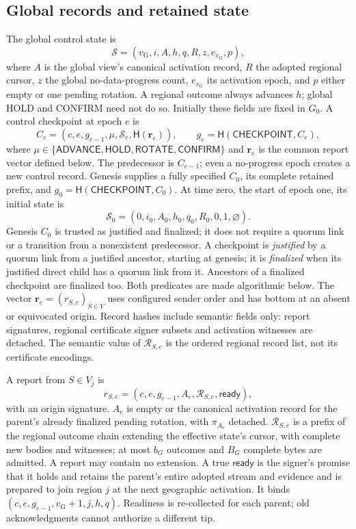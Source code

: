 \documentclass[11pt,a4paper,onecolumn]{article}
\newcommand{\Hash}{\mathsf H}
\newcommand{\gv}{v_{\mathrm G}}
\newcommand{\Tag}[1]{\mathsf{#1}}
\theoremstyle{remark}\newtheorem{example}[definition]{Example}
\begin{document}
\subsection{Global records and retained state}\label{sec:gobjects}
The global control state is
\[
 \mathcal S=(\gv,i,A,h,q,R,z,e_{\gv},p),
\]
where $A$ is the global view's canonical activation record, $R$ the adopted regional cursor,
$z$ the global no-data-progress count, $e_{\gv}$ its activation epoch, and $p$ either
empty or one pending rotation. A regional outcome always advances $h$; global
HOLD and CONFIRM need not do so. Initially these fields are fixed in $G_0$.
A control checkpoint at epoch $e$ is
\begin{equation}\label{eq:global}
 C_e=(c,e,g_{e-1},\mu,\mathcal S_e,\Hash(\mathbf r_e)),\qquad
 g_e=\Hash(\Tag{CHECKPOINT},C_e),
\end{equation}
where $\mu\in\{\Tag{ADVANCE},\Tag{HOLD},\Tag{ROTATE},\Tag{CONFIRM}\}$ and
$\mathbf r_e$ is the common report vector defined below. The predecessor is
$C_{e-1}$; even a no-progress epoch creates a new control record. Genesis
supplies a fully specified $C_0$, its complete retained prefix, and
$g_0=\Hash(\Tag{CHECKPOINT},C_0)$. At time zero, the start of epoch one,
its initial state is
\[
 \mathcal S_0=(0,i_0,A_0,h_0,q_0,R_0,0,1,\varnothing).
\]
Genesis $C_0$ is trusted as justified and finalized; it does not require a
quorum link or a transition from a nonexistent predecessor.
A checkpoint is \emph{justified} by a quorum link from a justified ancestor,
starting at genesis; it is \emph{finalized} when its justified direct child has
a quorum link from it. Ancestors of a finalized checkpoint are finalized too.
Both predicates are made algorithmic below.
The vector $\mathbf r_e=(r_{S,e})_{S\in V}$ uses configured sender order and
has bottom at an absent or equivocated origin. Record hashes include semantic
fields only: report signatures, regional certificate signer subsets and
activation witnesses are detached. The semantic value of $\mathcal R_{S,e}$
is the ordered regional record list, not its certificate encodings.

A report from $S\in V_j$ is
\[
 r_{S,e}=(c,e,g_{e-1},A_e,\mathcal R_{S,e},\mathsf{ready}),
\]
with an origin signature. $A_e$ is empty or the canonical activation record
for the parent's already finalized pending rotation, with $\pi_{A_e}$ detached. $\mathcal R_{S,e}$ is a prefix of the
regional outcome chain extending the effective state's cursor, with complete
new bodies and witnesses; at most $b_G$ outcomes and $B_G$ complete bytes are
admitted. A report may contain no extension. A true $\mathsf{ready}$ is the
signer's promise that it holds and retains the parent's entire adopted stream
and evidence and is prepared to join region $j$ at the next geographic
activation. It binds $(c,e,g_{e-1},\gv+1,j,h,q)$. Readiness is re-collected for each
parent; old acknowledgments cannot authorize a different tip.
\end{document}
